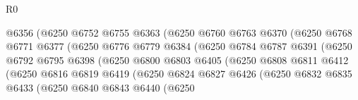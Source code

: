 \begin{lexlean}{R0}
\begin{coremodule}
                                  @6356
                                  (@6250
                                    @6752
                                    @6755
                                    @6363
                                    (@6250
                                      @6760
                                      @6763
                                      @6370
                                      (@6250
                                        @6768
                                        @6771
                                        @6377
                                        (@6250
                                          @6776
                                          @6779
                                          @6384
                                          (@6250
                                            @6784
                                            @6787
                                            @6391
                                            (@6250
                                              @6792
                                              @6795
                                              @6398
                                              (@6250
                                                @6800
                                                @6803
                                                @6405
                                                (@6250
                                                  @6808
                                                  @6811
                                                  @6412
                                                  (@6250
                                                    @6816
                                                    @6819
                                                    @6419
                                                    (@6250
                                                      @6824
                                                      @6827
                                                      @6426
                                                      (@6250
                                                        @6832
                                                        @6835
                                                        @6433
                                                        (@6250
                                                          @6840
                                                          @6843
                                                          @6440
                                                          (@6250

\end{coremodule}
\end{lexlean}
